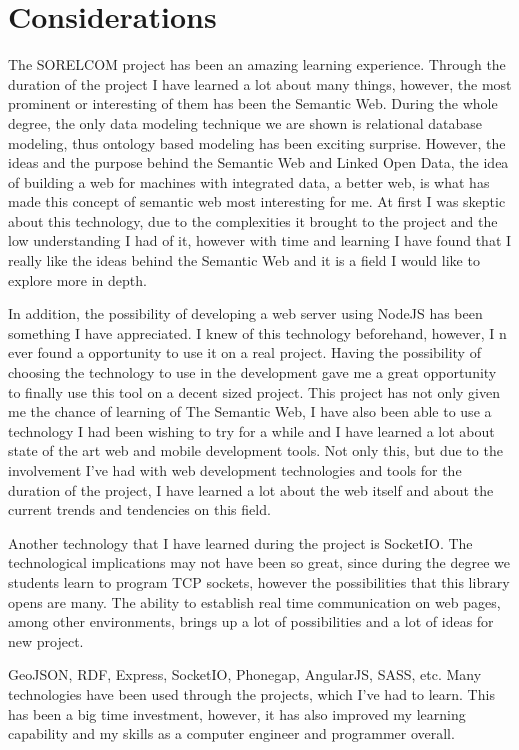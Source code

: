 \section{Considerations}

The SORELCOM project has been an amazing learning experience. Through the duration of the project I have learned a lot about many things, however, the most prominent or interesting of them has been the Semantic Web. During the whole degree, the only data modeling technique we are shown is relational database modeling, thus ontology based modeling has been exciting surprise. However, the ideas and the purpose behind the Semantic Web and Linked Open Data, the idea of building a web for machines with integrated data, a better web, is what has made this concept of semantic web most interesting for me. At first I was skeptic about this technology, due to the complexities it brought to the project and the low understanding I had of it, however with time and learning I have found that I really like the ideas behind the Semantic Web and it is a field I would like to explore more in depth.  

In addition, the possibility of developing a web server using NodeJS has been something I have appreciated. I knew of this technology beforehand, however, I n ever found a opportunity to use it on a real project. Having the possibility of choosing the technology to use in the development gave me a great opportunity to finally use this tool on a decent sized project. This project has not only given me the chance of learning of The Semantic Web, I have also been able to use a technology I had been wishing to try for a while and I have learned a lot about state of the art web and mobile development tools. Not only this, but due to the involvement I've had with web development technologies and tools for the duration of the project, I have learned a lot about the web itself and about the current trends and tendencies on this field. 

Another technology that I have learned during the project is SocketIO. The technological implications may not have been so great, since during the degree we students learn to program TCP sockets, however the possibilities that this library opens are many. The ability to establish real time communication on web pages, among other environments, brings up a lot of possibilities and a lot of ideas for new project.

GeoJSON, RDF, Express, SocketIO, Phonegap, AngularJS, SASS, etc. Many technologies have been used through the projects, which I've had to learn. This has been a big time investment, however, it has also improved my learning capability and my skills as a computer engineer and programmer overall.

